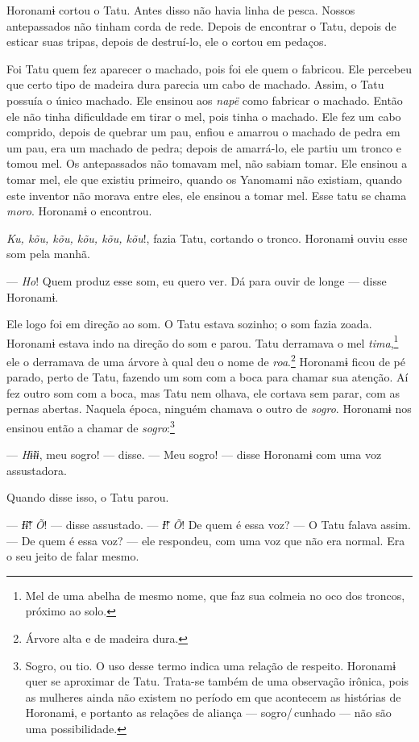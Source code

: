 Horonamɨ cortou o Tatu. Antes disso não havia linha de pesca. Nossos
antepassados não tinham corda de rede. Depois de encontrar o Tatu,
depois de esticar suas tripas, depois de destruí-lo, ele o cortou em
pedaços. 

Foi Tatu quem fez aparecer o machado, pois foi ele quem o fabricou. Ele
percebeu que certo tipo de madeira dura parecia um cabo de machado.
Assim, o Tatu possuía o único machado. Ele ensinou aos \textit{napë} como
fabricar o machado. Então ele não tinha dificuldade em tirar o mel, pois
tinha o machado. Ele fez um cabo comprido, depois de quebrar um pau,
enfiou e amarrou o machado de pedra em um pau, era um machado de pedra;
depois de amarrá-lo, ele partiu um tronco e tomou mel. Os antepassados
não tomavam mel, não sabiam tomar. Ele ensinou a tomar mel, ele que
existiu primeiro, quando os Yanomami não existiam, quando este inventor
não morava entre eles, ele ensinou a tomar mel. Esse tatu se
chama \textit{moro}. Horonamɨ o encontrou. 

\textit{Ku, kõu, kõu, kõu, kõu, kõu}!, fazia Tatu, cortando o tronco.
Horonamɨ ouviu esse som pela manhã. 

--- \textit{Ho}! Quem produz esse som, eu quero ver. Dá para ouvir de longe --- disse
Horonamɨ. 

Ele logo foi em direção ao som. O Tatu estava sozinho; o som fazia
zoada. Horonamɨ estava indo na direção do som e parou. Tatu derramava o
mel \textit{tima},\footnote{Mel de uma abelha de mesmo nome, que faz sua 
colmeia no oco dos troncos, próximo ao solo.} ele o derramava de uma árvore à qual deu o nome
de \textit{roa}.\footnote{Árvore alta e de madeira dura.} Horonamɨ ficou de pé parado, perto de Tatu, fazendo um som com a boca para chamar sua atenção. Aí fez
outro som com a boca, mas Tatu nem olhava, ele cortava sem parar, com as
pernas abertas. Naquela época, ninguém chamava o outro de \textit{sogro}.
Horonamɨ nos ensinou então a chamar de \textit{sogro}:\footnote{Sogro, ou tio. O uso desse termo indica uma relação de respeito. Horonamɨ quer se aproximar de Tatu. Trata-se também de uma observação irônica, pois as mulheres ainda não existem no período em que acontecem as histórias de Horonamɨ, e portanto as relações de aliança --- sogro/\,cunhado --- não são uma possibilidade.}

--- \textit{Hɨ̃ɨɨ}, meu sogro! --- disse. --- Meu sogro! --- disse Horonamɨ com
uma voz assustadora. 

Quando disse isso, o Tatu parou. 

--- \textit{Ɨ̃ɨ̃}! \textit{Õ}! --- disse assustado. --- \textit{Ɨ̃}! \textit{Õ}! De quem é 
essa voz? --- O Tatu falava assim. --- De quem é essa voz? --- ele respondeu, com uma voz que
não era normal. Era o seu jeito de falar mesmo. 

